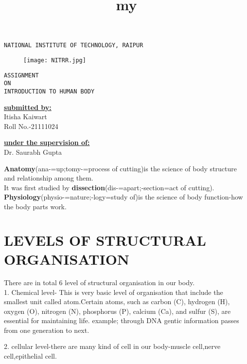 \documentclass[4pt]{article}
\title{my}
\begin{document}
\centering\huge\texttt{NATIONAL INSTITUTE OF TECHNOLOGY, RAIPUR}\\

\begin{figure}[h]
\centering
\texttt{[image: NITRR.jpg]}
\end{figure}
\begin{center}


\centering\huge\texttt{ASSIGNMENT\\ ON\\ INTRODUCTION TO HUMAN BODY}\\
\end{center}



\begin{minipage}[t]{5cm}
\flushleft\Large\textbf{\underline{submitted by:}}\\
Itisha Kaiwart\\
Roll No.-21111024
\end{minipage}
\hfill
\begin{minipage}[t]{5cm}
\Large\textbf{\underline{under the supervision of:}}\\
Dr. Saurabh Gupta
\end{minipage}

\newpage

\Large\flushleft\textbf{Anatomy}(ana-=up;tomy-=process of cutting)is the science of body structure and relationship among them.\\
It was first studied by \textbf{dissection}(dis-=apart;-section=act of cutting).\\
\textbf{Physiology}(physio-=nature;-logy=study of)is the science of body function-how the body parts work.

\section{\huge\textbf{LEVELS OF STRUCTURAL ORGANISATION}}
There are in total 6 level of structural organisation in our body.\\
1. Chemical level- This is very basic level of organisation that include the smallest unit called atom.Certain atoms, 
such as carbon (C), hydrogen (H), oxygen (O), nitrogen (N), 
phosphorus (P), calcium (Ca), and sulfur (S), are essential for maintaining life.
example; through DNA gentic information passes from one generation to next.

2. cellular level-there are many kind of cell in our body-muscle cell,nerve cell,epithelial cell.\\
\end{document}
